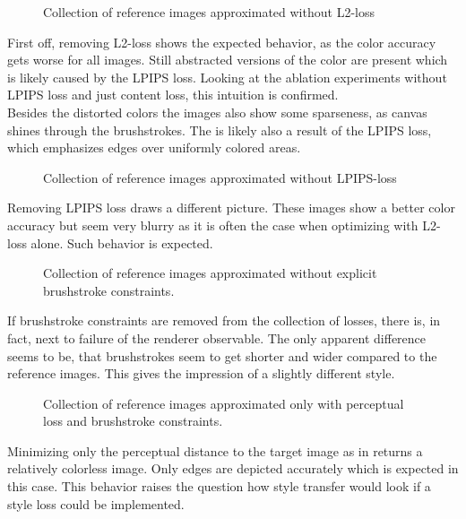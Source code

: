 \begin{figure*}
    \caption[]{Collection of reference images approximated without L2-loss}
\end{figure*}
First off, removing L2-loss shows the expected behavior, as the color accuracy gets worse for all images.
Still abstracted versions of the color are present which is likely caused by the LPIPS loss.
Looking at the ablation experiments without LPIPS loss and just content loss, this intuition is confirmed.\\
Besides the distorted colors the images also show some sparseness, as canvas shines through the brushstrokes.
The is likely also a result of the LPIPS loss, which emphasizes edges over uniformly colored areas.

\begin{figure*}
    \caption[]{Collection of reference images approximated without LPIPS-loss}
\end{figure*}
Removing LPIPS loss draws a different picture.
These images show a better color accuracy but seem very blurry as it is often the case when optimizing with L2-loss alone.
Such behavior is expected.

\begin{figure*}
    \caption[]{Collection of reference images approximated without explicit brushstroke constraints.}
\end{figure*}
If brushstroke constraints are removed from the collection of losses, there is, in fact, next to failure of the renderer observable.
The only apparent difference seems to be, that brushstrokes seem to get shorter and wider compared to the reference images.
This gives the impression of a slightly different style.

\begin{figure*}
    \caption[]{Collection of reference images approximated only with perceptual loss and brushstroke constraints.}
\end{figure*}
Minimizing only the perceptual distance to the target image as in  returns a relatively colorless image.
Only edges are depicted accurately which is expected in this case.
This behavior raises the question how style transfer would look if a style loss could be implemented.

